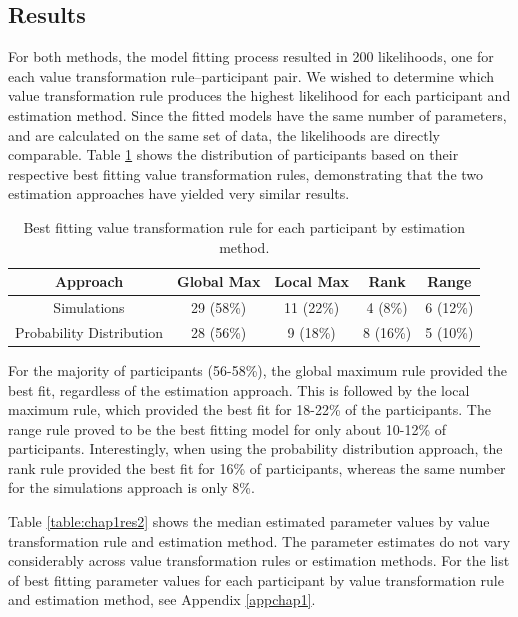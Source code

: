 \documentclass[11pt,a4paper]{article}
\begin{document}
\subsection{Results}

For both methods, the model fitting process resulted in 200 likelihoods, one for each value transformation rule--participant pair. We wished to determine which value transformation rule produces the highest likelihood for each participant and estimation method. Since the fitted models have the same number of parameters, and are calculated on the same set of data, the likelihoods are directly comparable. Table \ref{table:chap1res} shows the distribution of participants based on their respective best fitting value transformation rules, demonstrating that the two estimation approaches have yielded very similar results.
 
 
\begin{table}[ht]
\caption{Best fitting value transformation rule for each participant by estimation method.}
\centering
\begin{tabular}{ccccc}   

\toprule Approach  & Global Max    & Local Max & Rank & Range \\ 
\midrule Simulations  &  29 (58\%) & 11 (22\%)  & 4 (8\%)   & 6 (12\%) \\
       Probability Distribution & 28 (56\%)  &    9 (18\%)    & 8 (16\%)   & 5  (10\%)  \\
\bottomrule 
\end{tabular}
\label{table:chap1res}
\end{table}

For the majority of participants (56-58\%), the global maximum rule provided the best fit, regardless of the estimation approach. This is followed by the local maximum rule, which provided the best fit for 18-22\% of the participants. The range rule proved to be the best fitting model for only about 10-12\% of participants. Interestingly, when using the probability distribution approach, the rank rule provided the best fit for 16\% of participants, whereas the same number for the simulations approach is only 8\%. 

Table \ref{table:chap1res2} shows the median estimated parameter values by value transformation rule and estimation method. The parameter estimates do not vary considerably across value transformation rules or estimation methods. For the list of  best fitting parameter values for each participant by value transformation rule and estimation method, see Appendix \ref{appchap1}.
\end{document}
